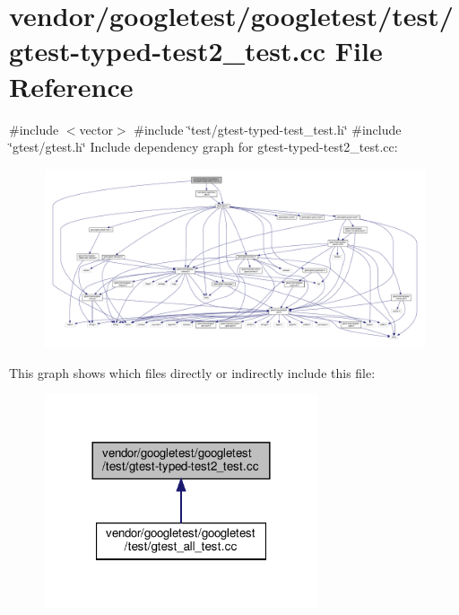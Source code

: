 \hypertarget{gtest-typed-test2__test_8cc}{}\section{vendor/googletest/googletest/test/gtest-\/typed-\/test2\+\_\+test.cc File Reference}
\label{gtest-typed-test2__test_8cc}
{\ttfamily \#include $<$vector$>$}\newline
{\ttfamily \#include \char`\"{}test/gtest-\/typed-\/test\+\_\+test.\+h\char`\"{}}\newline
{\ttfamily \#include \char`\"{}gtest/gtest.\+h\char`\"{}}\newline
Include dependency graph for gtest-\/typed-\/test2\+\_\+test.cc\+:
\nopagebreak
\begin{figure}[H]
\begin{center}
\leavevmode
\includegraphics[width=350pt]{gtest-typed-test2__test_8cc__incl}
\end{center}
\end{figure}
This graph shows which files directly or indirectly include this file\+:
\nopagebreak
\begin{figure}[H]
\begin{center}
\leavevmode
\includegraphics[width=228pt]{gtest-typed-test2__test_8cc__dep__incl}
\end{center}
\end{figure}
